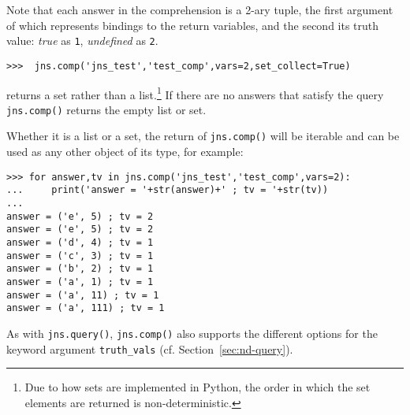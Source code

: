 \begin{example}
\noindent
Note that each answer in the comprehension is a 2-ary tuple, the first
argument of which represents bindings to the return variables, and the
second its truth value: {\em true} as {\tt 1}, {\em undefined} as {\tt 2}.


\begin{verbatim}
>>>  jns.comp('jns_test','test_comp',vars=2,set_collect=True)
\end{verbatim}

\noindent
returns a set rather than a list.\footnote{Due to how sets are
implemented in Python, the order in which the set elements are
returned is non-deterministic.}  If there are no answers that satisfy
the query {\tt jns.comp()} returns the empty list or set. 


Whether it is a list or a set, the return of {\tt jns.comp()} will be
iterable and can be used as any other object of its type, for
example:

{\small
  \begin{verbatim}
>>> for answer,tv in jns.comp('jns_test','test_comp',vars=2):
...     print('answer = '+str(answer)+' ; tv = '+str(tv))
... 
answer = ('e', 5) ; tv = 2
answer = ('e', 5) ; tv = 2
answer = ('d', 4) ; tv = 1
answer = ('c', 3) ; tv = 1
answer = ('b', 2) ; tv = 1
answer = ('a', 1) ; tv = 1
answer = ('a', 11) ; tv = 1
answer = ('a', 111) ; tv = 1
\end{verbatim}
  }
\end{example}

As with {\tt jns.query()}, {\tt jns.comp()} also supports the
different options for the keyword argument {\tt truth\_vals}
(cf. Section~\ref{sec:nd-query}).


